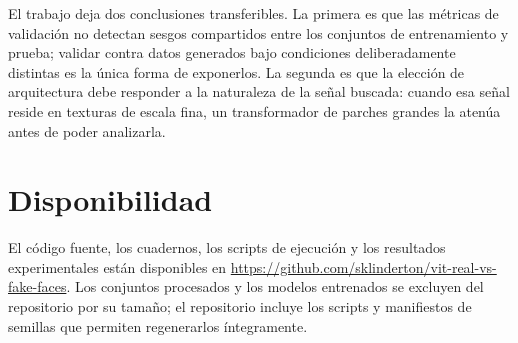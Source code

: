 \documentclass[10pt,twocolumn,letterpaper]{article}
\begin{document}
El trabajo deja dos conclusiones transferibles. La primera es que las
métricas de validación no detectan sesgos compartidos entre los conjuntos de
entrenamiento y prueba; validar contra datos generados bajo condiciones
deliberadamente distintas es la única forma de exponerlos. La segunda es que
la elección de arquitectura debe responder a la naturaleza de la señal
buscada: cuando esa señal reside en texturas de escala fina, un
transformador de parches grandes la atenúa antes de poder analizarla.

\section*{Disponibilidad}

El código fuente, los cuadernos, los scripts de ejecución y los resultados
experimentales están disponibles en
\url{https://github.com/sklinderton/vit-real-vs-fake-faces}. Los conjuntos
procesados y los modelos entrenados se excluyen del repositorio por su
tamaño; el repositorio incluye los scripts y manifiestos de semillas que
permiten regenerarlos íntegramente.
\end{document}
